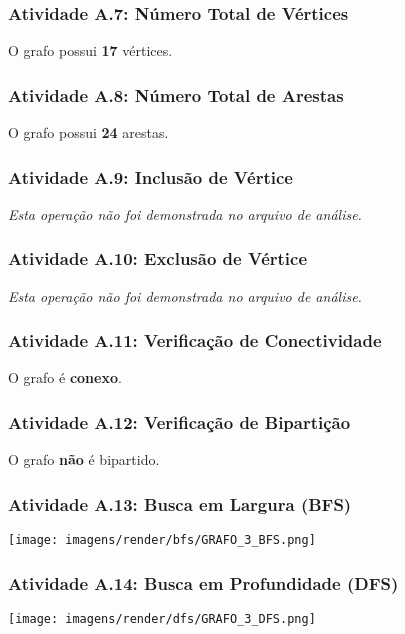 \documentclass[a4paper,12pt]{article}
\begin{document}
\subsubsection*{Atividade A.7: Número Total de Vértices}
O grafo possui \textbf{17} vértices.

\subsubsection*{Atividade A.8: Número Total de Arestas}
O grafo possui \textbf{24} arestas.

\subsubsection*{Atividade A.9: Inclusão de Vértice}
\textit{Esta operação não foi demonstrada no arquivo de análise.}

\subsubsection*{Atividade A.10: Exclusão de Vértice}
\textit{Esta operação não foi demonstrada no arquivo de análise.}

\subsubsection*{Atividade A.11: Verificação de Conectividade}
O grafo é \textbf{conexo}.

\subsubsection*{Atividade A.12: Verificação de Bipartição}
O grafo \textbf{não} é bipartido.

\subsubsection*{Atividade A.13: Busca em Largura (BFS)}
\begin{center}
    \texttt{[image: imagens/render/bfs/GRAFO\_3\_BFS.png]}
\end{center}

\subsubsection*{Atividade A.14: Busca em Profundidade (DFS)}
\begin{center}
    \texttt{[image: imagens/render/dfs/GRAFO\_3\_DFS.png]}
\end{center}
\end{document}

